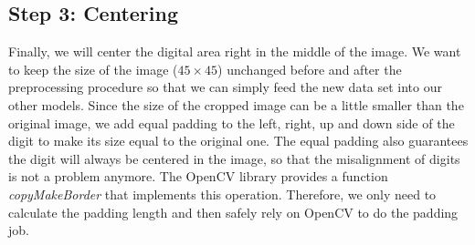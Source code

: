 \documentclass{article}
\begin{document}
\subsection{Step 3: Centering}
Finally, we will center the digital area right in the middle of the image. We want to keep the size of the image ($45\times 45$) unchanged before and after the preprocessing procedure so that we can simply feed the new data set into our other models. Since the size of the cropped image can be a little smaller than the original image, we add equal padding to the left, right, up and down side of the digit to make its size equal to the original one. The equal padding also guarantees the digit will always be centered in the image, so that the misalignment of digits is not a problem anymore. The OpenCV library provides a function \textit{copyMakeBorder} that implements this operation. Therefore, we only need to calculate the padding length and then safely rely on OpenCV to do the padding job. 
\end{document}
